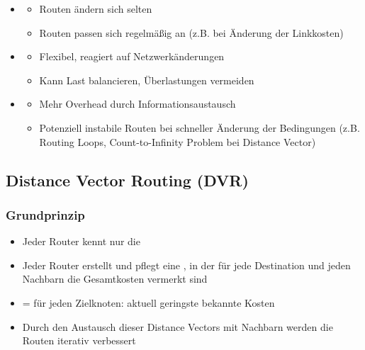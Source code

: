 \begin{itemize}
\begin{itemize}
        \item {}
        \begin{itemize}
            \item {} Routen ändern sich selten
            \item {} Routen passen sich regelmäßig an (z.B. bei Änderung der Linkkosten)
        \end{itemize}
        \item {}
        \begin{itemize}
            \item Flexibel, reagiert auf Netzwerkänderungen
            \item Kann Last balancieren, Überlastungen vermeiden
        \end{itemize}
        \item {}
        \begin{itemize}
            \item Mehr Overhead durch Informationsaustausch
            \item Potenziell instabile Routen bei schneller Änderung der Bedingungen (z.B. Routing Loops, Count-to-Infinity Problem bei Distance Vector)
        \end{itemize}
    \end{itemize}
\end{itemize}
\clearpage
\subsection{Distance Vector Routing (DVR)}
\subsubsection*{Grundprinzip}
\begin{itemize}
    \item Jeder Router kennt nur die 
    \item Jeder Router erstellt und pflegt eine , in der für jede Destination und jeden Nachbarn die Gesamtkosten vermerkt sind
    \item {} = für jeden Zielknoten: aktuell geringste bekannte Kosten
    \item Durch den Austausch dieser Distance Vectors mit Nachbarn werden die Routen iterativ verbessert
\end{itemize}
